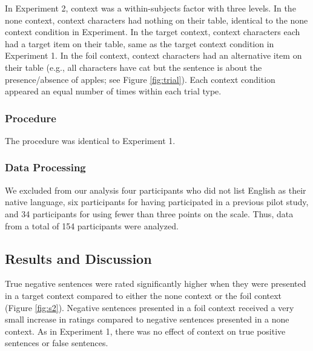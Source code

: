 \documentclass[10pt,letterpaper]{article}
\begin{document}
In Experiment 2, context was a within-subjects factor with three levels. In the none context, context characters had nothing on their table, identical to the none context condition in Experiment. In the target context, context characters each had a target item on their table, same as the target context condition in Experiment 1. In the foil context, context characters had an alternative item on their table (e.g., all characters have cat but the sentence is about the presence/absence of apples; see Figure \ref{fig:trial}).  Each context condition appeared an equal number of times within each trial type.  

\subsubsection{Procedure}

The procedure was identical to Experiment 1.

\subsubsection{Data Processing}

We excluded from our analysis four participants who did not list English as their native language, six participants for having participated in a previous pilot study, and 34 participants for using fewer than three points on the scale.  Thus, data from a total of 154 participants were analyzed.  

\subsection{Results and Discussion}

True negative sentences were rated significantly higher when they were presented in a target context compared to either the none context or the foil context (Figure \ref{fig:s2}).  Negative sentences presented in a foil context received a very small increase in ratings compared to negative sentences presented in a none context. As in Experiment 1, there was no effect of context on true positive sentences or false sentences.  

\end{document}
